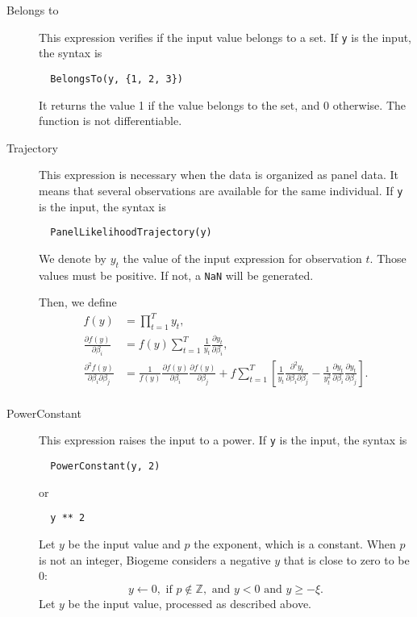 \documentclass[12pt,a4paper]{article}
\begin{document}
\begin{description}
\item[Belongs to] This expression verifies if the input value belongs to a set. 
If \lstinline+y+ is the input, the syntax is
\begin{lstlisting}
  BelongsTo(y, {1, 2, 3})
\end{lstlisting}
It returns the value 1 if the value belongs to the set, and 0 otherwise. The function is not differentiable.

\item[Trajectory] This expression is necessary when the data is organized as panel data. It means that several observations are available for the same individual.
If \lstinline+y+ is the input, the syntax is
\begin{lstlisting}
  PanelLikelihoodTrajectory(y)
\end{lstlisting}
We denote by $y_t$ the value of the input expression for observation $t$. Those values must be positive. If not, a \texttt{NaN} will be generated.

Then, we define
  \begin{align*}
    f(y) &= \prod_{t=1}^T y_t, \\
    \frac{\partial f(y)}{\partial \beta_i} &= f(y)\sum_{t=1}^T \frac{1}{y_t} \frac{\partial y_t}{\partial \beta_i},\\
    \frac{\partial^2 f(y)}{\partial \beta_i\partial \beta_j} &= \frac{1}{f(y)}\frac{\partial f(y)}{\partial \beta_i}\frac{\partial f(y)}{\partial \beta_j} + f \sum_{t=1}^T\left[\frac{1}{y_t}\frac{\partial^2 y_t}{\partial \beta_i \partial \beta_j } - \frac{1}{y_t^2} \frac{\partial y_t}{\partial \beta_i}\frac{\partial y_t}{\partial \beta_j} \right].\\
  \end{align*}

  \item[PowerConstant] This expression raises the input to a power. If \lstinline+y+ is the input, the syntax is
\begin{lstlisting}
  PowerConstant(y, 2)
\end{lstlisting}
or
\begin{lstlisting}
  y ** 2
\end{lstlisting}
Let $y$ be the input value and $p$ the exponent, which is a constant.
  When $p$ is not an integer, Biogeme considers a negative $y$ that is close to zero to be 0:
  \[
  y \leftarrow 0, \text{ if } p \notin \mathbb{Z}, \text{ and } y < 0 \text{ and } y \geq -\xi.
  \]
  Let $y$ be the input value, processed as described above.



\end{description}
\end{document}
